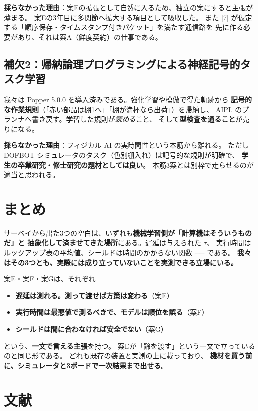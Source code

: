 \documentclass[11pt,a4paper]{article}
\newcommand{\prob}[1]{\textbf{\textcolor{red!55!black}{#1}}}
\newcommand{\keyp}[1]{\textbf{\textcolor{blue!45!black}{#1}}}
\begin{document}
\noindent
\prob{採らなかった理由}：案Eの拡張として自然に入るため、独立の案にすると主張が薄まる。
案Eの3年目に多関節へ拡大する項目として吸収した。
また [7] が仮定する「順序保存・タイムスタンプ付きパケット」を満たす通信路を
先に作る必要があり、それは案A（鮮度契約）の仕事である。

\subsection*{補欠2：帰納論理プログラミングによる神経記号的タスク学習}

我々は Popper 5.0.0 を導入済みである。強化学習や模倣で得た軌跡から
\keyp{記号的な作業規則}（「赤い部品は棚1へ」「棚が満杯なら出荷」）を帰納し、
AIPL のプランナへ書き戻す。学習した規則が\emph{読める}こと、
そして\keyp{型検査を通ること}が売りになる。

\noindent
\prob{採らなかった理由}：フィジカル AI の実時間性という本筋から離れる。
ただし DOFBOT シミュレータのタスク（色別棚入れ）は記号的な規則が明確で、
\keyp{学生の卒業研究・修士研究の題材としては良い}。
本筋3案とは別枠で走らせるのが適当と思われる。

\section{まとめ}

サーベイから出た3つの空白は、いずれも\keyp{機械学習側が「計算機はそういうものだ」と
抽象化して済ませてきた場所}にある。遅延は与えられた $\tau$、
実行時間はルックアップ表の平均値、シールドは時間のかからない関数 ── である。
\prob{我々はその3つとも、実際には成り立っていないことを実測できる立場にいる。}

\medskip
\noindent
案E・案F・案Gは、それぞれ

\begin{itemize}[leftmargin=1.4em,itemsep=2pt]
  \item \keyp{遅延は測れる。測って渡せば方策は変わる}（案E）
  \item \keyp{実行時間は最悪値で測るべきで、モデルは順位を誤る}（案F）
  \item \keyp{シールドは間に合わなければ安全でない}（案G）
\end{itemize}

\noindent
という、\keyp{一文で言える主張}を持つ。
案Dが「齢を渡す」という一文で立っているのと同じ形である。
どれも既存の装置と実測の上に載っており、
\keyp{機材を買う前に、シミュレータと3ボードで一次結果まで出せる}。

\section*{文献}
\end{document}
